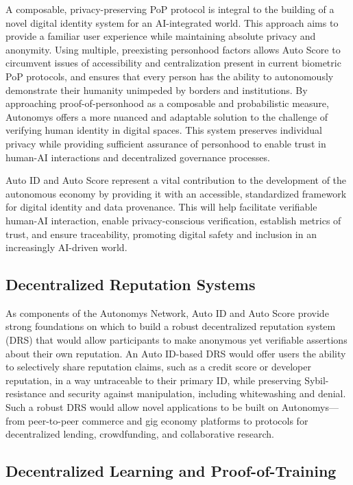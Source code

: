 \documentclass[conference]{IEEEtran}
\begin{document}
A composable, privacy-preserving PoP protocol is integral to the building of a novel digital identity system for an AI-integrated world. This approach aims to provide a familiar user experience while maintaining absolute privacy and anonymity. Using multiple, preexisting personhood factors allows Auto Score to circumvent issues of accessibility and centralization present in current biometric PoP protocols\cite{buterin2023}, and ensures that every person has the ability to autonomously demonstrate their humanity unimpeded by borders and institutions. By approaching proof-of-personhood as a composable and probabilistic measure, Autonomys offers a more nuanced and adaptable solution to the challenge of verifying human identity in digital spaces. This system preserves individual privacy while providing sufficient assurance of personhood to enable trust in human-AI interactions and decentralized governance processes.

Auto ID and Auto Score represent a vital contribution to the development of the autonomous economy by providing it with an accessible, standardized framework for digital identity and data provenance. This will help facilitate verifiable human-AI interaction, enable privacy-conscious verification, establish metrics of trust, and ensure traceability, promoting digital safety and inclusion in an increasingly AI-driven world.

\subsection{Decentralized Reputation Systems}

As components of the Autonomys Network, Auto ID and Auto Score provide strong foundations on which to build a robust decentralized reputation system (DRS) that would allow participants to make anonymous yet verifiable assertions about their own reputation\cite{drs}. An Auto ID-based DRS would offer users the ability to selectively share reputation claims, such as a credit score or developer reputation, in a way untraceable to their primary ID, while preserving Sybil-resistance and security against manipulation, including whitewashing and denial. Such a robust DRS would allow novel applications to be built on Autonomys—from peer-to-peer commerce and gig economy platforms to protocols for decentralized lending, crowdfunding, and collaborative research.

\subsection{Decentralized Learning and Proof-of-Training}
\end{document}
